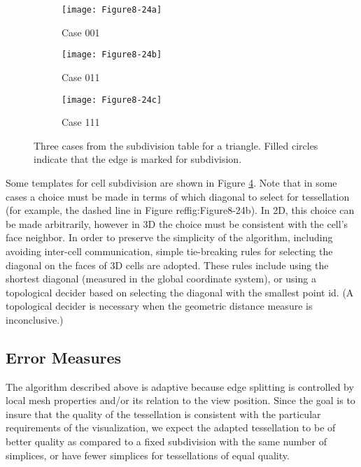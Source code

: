 \begin{figure}[!htb]
    \centering
    \begin{subfigure}{0.32\linewidth}
        \centering
        \texttt{[image: Figure8-24a]}
        \caption{Case 001}\label{fig:Figure8-24a}
    \end{subfigure}
    \hfill
    \begin{subfigure}{0.32\linewidth}
        \centering
        \texttt{[image: Figure8-24b]}
        \caption{Case 011}\label{fig:Figure8-24b}
    \end{subfigure}%
    \hfill
    \begin{subfigure}{0.32\linewidth}
        \centering
        \texttt{[image: Figure8-24c]}
        \caption{Case 111}\label{fig:Figure8-24c}
    \end{subfigure}%
    \caption{Three cases from the subdivision table for a triangle. Filled circles indicate that the edge is marked for subdivision.}
    \label{fig:Figure8-24}
\end{figure}

Some templates for cell subdivision are shown in Figure \ref{fig:Figure8-24}. Note that in some cases a choice must be made in terms of which diagonal to select for tessellation (for example, the dashed line in Figure ref{fig:Figure8-24b}). In 2D, this choice can be made arbitrarily, however in 3D the choice must be consistent with the cell's face neighbor. In order to preserve the simplicity of the algorithm, including avoiding inter-cell communication, simple tie-breaking rules for selecting the diagonal on the faces of 3D cells are adopted. These rules include using the shortest diagonal (measured in the global coordinate system), or using a topological decider based on selecting the diagonal with the smallest point id. (A topological decider is necessary when the geometric distance measure is inconclusive.)

\subsection{Error Measures}

The algorithm described above is adaptive because edge splitting is controlled by local mesh properties and/or its relation to the view position. Since the goal is to insure that the quality of the tessellation is consistent with the particular requirements of the visualization, we expect the adapted tessellation to be of better quality as compared to a fixed subdivision with the same number of simplices, or have fewer simplices for tessellations of equal quality.

